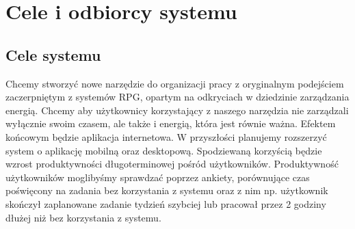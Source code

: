 \documentclass[a4paper,11pt]{report}
\begin{document}
\section {Cele i odbiorcy systemu}
\subsection {Cele systemu}
Chcemy stworzyć nowe narzędzie do organizacji pracy z oryginalnym podejściem zaczerpniętym z systemów RPG, opartym na odkryciach w dziedzinie zarządzania energią\cite{Harward}. Chcemy aby użytkownicy korzystający z naszego narzędzia nie zarządzali wyłącznie swoim czasem, ale także i energią, która jest równie ważna. Efektem końcowym będzie aplikacja internetowa. W przyszłości planujemy rozszerzyć system o aplikację mobilną oraz desktopową. Spodziewaną korzyścią będzie wzrost produktywności długoterminowej pośród użytkowników. Produktywność użytkowników moglibyśmy sprawdzać poprzez ankiety, porównujące czas poświęcony na zadania bez korzystania z systemu oraz z nim np. użytkownik skończył zaplanowane zadanie tydzień szybciej lub pracował przez 2 godziny dłużej niż bez korzystania z systemu.\\
\end{document}

